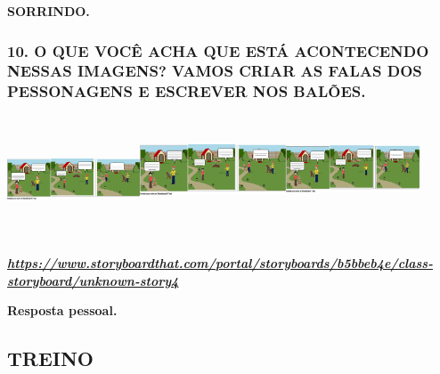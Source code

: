 \begin{escola}
\textbf{SORRINDO.}

\subsubsection[10. O QUE VOCÊ ACHA QUE ESTÁ ACONTECENDO NESSAS IMAGENS?
VAMOS CRIAR AS FALAS DOS PESSONAGENS E ESCREVER NOS
BALÕES.]{\texorpdfstring{10. O QUE VOCÊ ACHA QUE ESTÁ ACONTECENDO NESSAS
IMAGENS? VAMOS CRIAR AS FALAS DOS PESSONAGENS E ESCREVER NOS
BALÕES.\protect\includegraphics[width=1.55139in,height=1.32153in]{media/image177.png}\protect\includegraphics[width=1.70417in,height=1.53958in]{media/image178.png}\protect\includegraphics[width=1.56667in,height=1.56736in]{media/image179.png}}{10. O QUE VOCÊ ACHA QUE ESTÁ ACONTECENDO NESSAS IMAGENS? VAMOS CRIAR AS FALAS DOS PESSONAGENS E ESCREVER NOS BALÕES.}}\label{o-que-vocuxea-acha-que-estuxe1-acontecendo-nessas-imagens-vamos-criar-as-falas-dos-pessonagens-e-escrever-nos-baluxf5es.}

\href{https://www.storyboardthat.com/portal/storyboards/b5bbeb4e/class-storyboard/unknown-story4}{\textbf{\emph{https://www.storyboardthat.com/portal/storyboards/b5bbeb4e/class-storyboard/unknown-story4}}}

\textbf{Resposta pessoal.}

\subsection{TREINO}\label{treino-6}


\end{escola}
